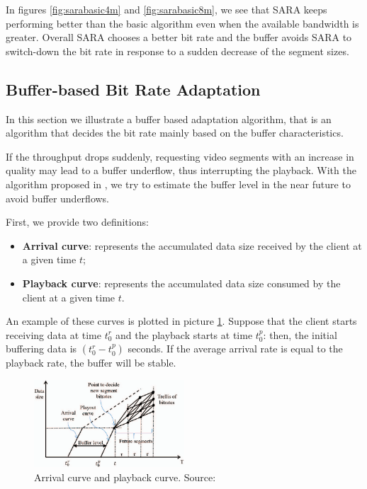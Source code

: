\documentclass[openany]{book}
\begin{document}
In figures \ref{fig:sarabasic4m} and \ref{fig:sarabasic8m}, we see that SARA keeps performing better than the basic algorithm even when the available bandwidth is greater. Overall SARA chooses a better bit rate and the buffer avoids SARA to switch-down the bit rate in response to a sudden decrease of the segment sizes.

\subsection{Buffer-based Bit Rate Adaptation}\label{subsec:buffer}
In this section we illustrate a buffer based adaptation algorithm, that is an algorithm that decides the bit rate mainly based on the buffer characteristics.

If the throughput drops suddenly, requesting video segments with an increase in quality may lead to a buffer underflow, thus interrupting the playback. With the algorithm proposed in \cite{buffer}, we try to estimate the buffer level in the near future to avoid buffer underflows.

First, we provide two definitions:
\begin{itemize}
\item \textbf{Arrival curve}: represents the accumulated data size received by the client at a given time $t$;
\item \textbf{Playback curve}: represents the accumulated data size consumed by the client at a given time $t$.
\end{itemize}
An example of these curves is plotted in picture \ref{fig:buffercurves}. Suppose that the client starts receiving data at time $t_0^r$ and the playback starts at time $t_0^p$: then, the initial buffering data is $(t_0^r-t_0^p)$ seconds. If the average arrival rate is equal to the playback rate, the buffer will be stable.

\begin{figure}[ht]
\centering
\includegraphics[width=0.5\textwidth]{buffer_curves}
\caption{Arrival curve and playback curve. Source: \cite{buffer}}\label{fig:buffercurves}
\end{figure}
\end{document}
